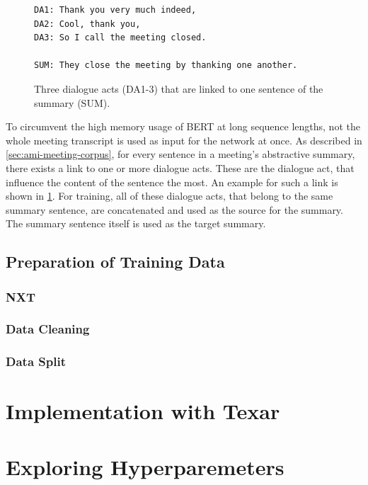 \begin{figure}[h]
\begin{lstlisting}[numbers=none]
DA1: Thank you very much indeed,
DA2: Cool, thank you,
DA3: So I call the meeting closed.

SUM: They close the meeting by thanking one another.
\end{lstlisting}
\caption{Three dialogue acts (DA1-3) that are linked to one sentence of the summary (SUM).}
\label{fig:dialogue-arc-summary-link-example}
\end{figure}

To circumvent the high memory usage of BERT at long sequence lengths, not the whole meeting transcript is used as input for the network at once.
As described in \cref{sec:ami-meeting-corpus}, for every sentence in a meeting's abstractive summary, there exists a link to one or more dialogue acts.
These are the dialogue act, that influence the content of the sentence the most.
An example for such a link is shown in \cref{fig:dialogue-arc-summary-link-example}.
For training, all of these dialogue acts, that belong to the same summary sentence, are concatenated and used as the source for the summary.
The summary sentence itself is used as the target summary.

\subsection{Preparation of Training Data}



\subsubsection{NXT}

\subsubsection{Data Cleaning}

\subsubsection{Data Split}


\section{Implementation with Texar}


\section{Exploring Hyperparemeters}
